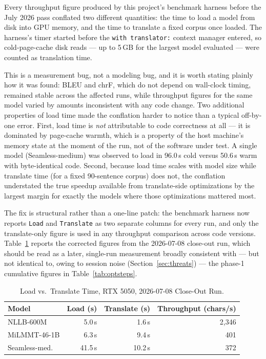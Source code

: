 \documentclass[conference]{IEEEtran}
\newcommand{\NLLBCLOSEOUTCHS}{2{,}346}
\newcommand{\NLLBCLOSEOUTLOAD}{5.0\,s}
\newcommand{\NLLBCLOSEOUTTRANS}{1.6\,s}
\newcommand{\MILMMTCLOSEOUTCHS}{401}
\newcommand{\MILMMTCLOSEOUTLOAD}{6.3\,s}
\newcommand{\MILMMTCLOSEOUTTRANS}{9.4\,s}
\newcommand{\SEAMLESSCLOSEOUTCHS}{372}
\newcommand{\SEAMLESSCLOSEOUTLOAD}{41.5\,s}
\newcommand{\SEAMLESSCLOSEOUTTRANS}{10.2\,s}
\begin{document}
Every throughput figure produced by this project's benchmark harness
before the July 2026 pass conflated two different quantities: the time to
load a model from disk into GPU memory, and the time to translate a fixed
corpus once loaded. The harness's timer started before the
\texttt{with translator:} context manager entered, so cold-page-cache
disk reads --- up to 5\,GB for the largest model evaluated --- were
counted as translation time.

This is a measurement bug, not a modeling bug, and it is worth stating
plainly how it was found: BLEU and chrF, which do not depend on wall-clock
timing, remained stable across the affected runs, while throughput
figures for the same model varied by amounts inconsistent with any code
change. Two additional properties of load time made the conflation harder
to notice than a typical off-by-one error. First, load time is
\emph{not} attributable to code correctness at all --- it is dominated by
page-cache warmth, which is a property of the host machine's memory state
at the moment of the run, not of the software under test. A single model
(Seamless-medium) was observed to load in 96.0\,s cold versus 50.6\,s
warm with byte-identical code. Second, because load time scales with
model size while translate time (for a fixed 90-sentence corpus) does
not, the conflation understated the true speedup available from
translate-side optimizations by the largest margin for exactly the
models where those optimizations mattered most.

The fix is structural rather than a one-line patch: the benchmark harness
now reports \texttt{Load} and \texttt{Translate} as two separate columns
for every run, and only the translate-only figure is used in any
throughput comparison across code versions. Table~\ref{tab:closeout}
reports the corrected figures from the 2026-07-08 close-out run, which
should be read as a later, single-run measurement broadly consistent with
--- but not identical to, owing to session noise (Section~\ref{sec:threats})
--- the phase-1 cumulative figures in Table~\ref{tab:optsteps}.

\begin{table}[htbp]
\caption{Load vs.\ Translate Time, RTX 5050, 2026-07-08 Close-Out Run.}
\label{tab:closeout}
\centering
\begin{tabular}{lrrr}
\toprule
Model & Load (s) & Translate (s) & Throughput (chars/s) \\
\midrule
NLLB-600M    & \NLLBCLOSEOUTLOAD{}   & \NLLBCLOSEOUTTRANS{}   & \NLLBCLOSEOUTCHS{} \\
MiLMMT-46-1B & \MILMMTCLOSEOUTLOAD{} & \MILMMTCLOSEOUTTRANS{} & \MILMMTCLOSEOUTCHS{} \\
Seamless-med.& \SEAMLESSCLOSEOUTLOAD{}& \SEAMLESSCLOSEOUTTRANS{}& \SEAMLESSCLOSEOUTCHS{} \\
\bottomrule
\end{tabular}
\end{table}
\end{document}
